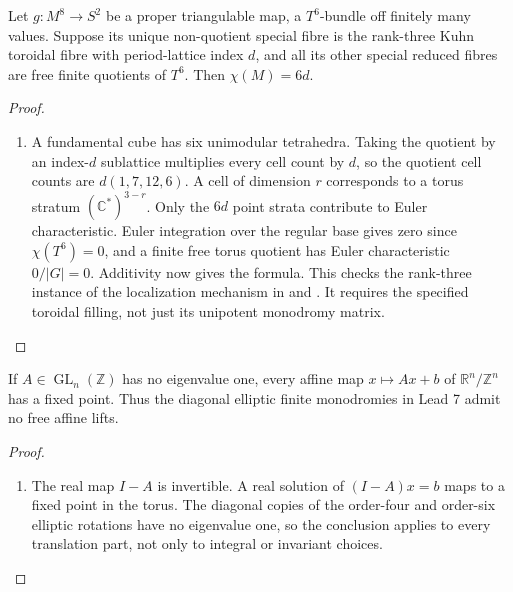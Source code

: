 \begin{theorem}\label{maps:src:F.1.1}


Let $g:M^8\to S^2$ be a proper triangulable map, a $T^6$-bundle
off finitely many values.  Suppose its unique non-quotient special
fibre is the rank-three Kuhn toroidal fibre with period-lattice
index $d$, and all its other special reduced fibres are free
finite quotients of $T^6$.  Then $\chi(M)=6d$.

\end{theorem}


\begin{proof}
\begin{enumerate}[label=\arabic*.]
\item A fundamental cube has six unimodular tetrahedra.  Taking the
quotient by an index-$d$ sublattice multiplies every cell count
by $d$, so the quotient cell counts are $d(1,7,12,6)$.
A cell of dimension $r$ corresponds to a torus stratum
$(\mathbb C^*)^{3-r}$.  Only the $6d$ point strata contribute
to Euler characteristic.  Euler integration over the regular
base gives zero since $\chi(T^6)=0$, and a finite free torus
quotient has Euler characteristic $0/|G|=0$.  Additivity now
gives the formula.  This checks the rank-three instance of the
localization mechanism in  and .  It requires the specified
toroidal filling, not just its unipotent monodromy matrix.

\end{enumerate}
\end{proof}




\begin{proposition}\label{maps:src:F.1.4}


If $A\in\operatorname{GL}_n(\mathbb Z)$ has no eigenvalue one,
every affine map $x\mapsto Ax+b$ of $\mathbb R^n/\mathbb Z^n$
has a fixed point.  Thus the diagonal elliptic finite monodromies
in Lead 7 admit no free affine lifts.

\end{proposition}


\begin{proof}
\begin{enumerate}[label=\arabic*.]
\item The real map $I-A$ is invertible.  A real solution of
$(I-A)x=b$ maps to a fixed point in the torus.  The diagonal
copies of the order-four and order-six elliptic rotations have
no eigenvalue one, so the conclusion applies to every translation
part, not only to integral or invariant choices.

\end{enumerate}
\end{proof}




